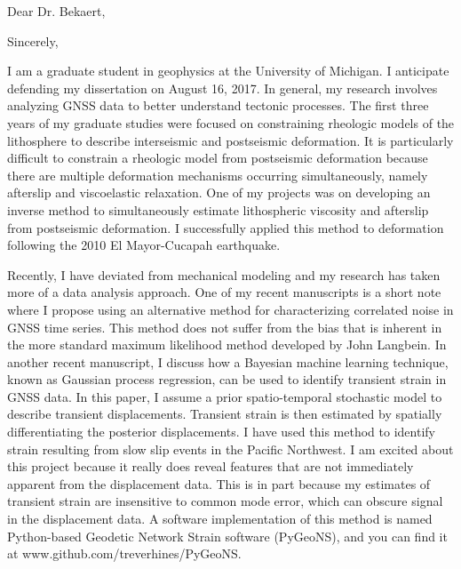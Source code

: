 \documentclass[11pt,a4paper,sans]{moderncv}
\begin{document}
\date{June 27, 2017}
\opening{Dear Dr. Bekaert,}
\closing{Sincerely,}
\makelettertitle

I am a graduate student in geophysics at the University of Michigan. I anticipate defending my dissertation on August 16, 2017. In general, my research involves analyzing GNSS data to better understand tectonic processes. The first three years of my graduate studies were focused on constraining rheologic models of the lithosphere to describe interseismic and postseismic deformation. It is particularly difficult to constrain a rheologic model from postseismic deformation because there are multiple deformation mechanisms occurring simultaneously, namely afterslip and viscoelastic relaxation. One of my projects was on developing an inverse method to simultaneously estimate lithospheric viscosity and afterslip from postseismic deformation. I successfully applied this method to deformation following the 2010 El Mayor-Cucapah earthquake.

Recently, I have deviated from mechanical modeling and my research has taken more of a data analysis approach. One of my recent manuscripts is a short note where I propose using an alternative method for characterizing correlated noise in GNSS time series. This method does not suffer from the bias that is inherent in the more standard maximum likelihood method developed by John Langbein. In another recent manuscript, I discuss how a Bayesian machine learning technique, known as Gaussian process regression, can be used to identify transient strain in GNSS data. In this paper, I assume a prior spatio-temporal stochastic model to describe transient displacements. Transient strain is then estimated by spatially differentiating the posterior displacements. I have used this method to identify strain resulting from slow slip events in the Pacific Northwest. I am excited about this project because it really does reveal features that are not immediately apparent from the displacement data. This is in part because my estimates of transient strain are insensitive to common mode error, which can obscure signal in the displacement data. A software implementation of this method is named Python-based Geodetic Network Strain software (PyGeoNS), and you can find it at www.github.com/treverhines/PyGeoNS.       
\end{document}
